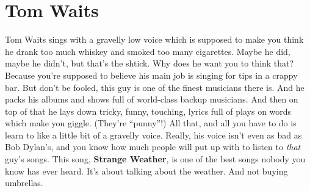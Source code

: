 \documentclass[letterpaper,single]{article}
\begin{document}
\section{Tom Waits}
Tom Waits sings with a gravelly low voice which is supposed to make you think he drank too much whiskey and smoked too many cigarettes. 
Maybe he did, maybe he didn't, but that's the shtick. 
Why does he want you to think that? 
Because you're supposed to believe his main job is singing for tips in a crappy bar. 
But don't be fooled, this guy is one of the finest musicians there is. 
And he packs his albums and shows full of world-class backup musicians. 
And then on top of that he lays down tricky, funny, touching, lyrics full of plays on words which make you giggle.
(They're ``punny''!)
All that, and all you have to do is learn to like a little bit of a gravelly voice. 
Really, his voice isn't even as bad as Bob Dylan's, and you know how much people will put up with to listen to \emph{that} guy's songs.
This song, \textbf{Strange Weather}, is one of the best songs nobody you know has ever heard.
It's about talking about the weather. And not buying umbrellas.
\end{document}
